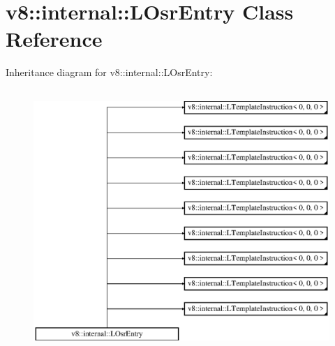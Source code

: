 \hypertarget{classv8_1_1internal_1_1_l_osr_entry}{}\section{v8\+:\+:internal\+:\+:L\+Osr\+Entry Class Reference}
\label{classv8_1_1internal_1_1_l_osr_entry}
Inheritance diagram for v8\+:\+:internal\+:\+:L\+Osr\+Entry\+:\begin{figure}[H]
\begin{center}
\leavevmode
\includegraphics[height=10.000000cm]{classv8_1_1internal_1_1_l_osr_entry}
\end{center}
\end{figure}
